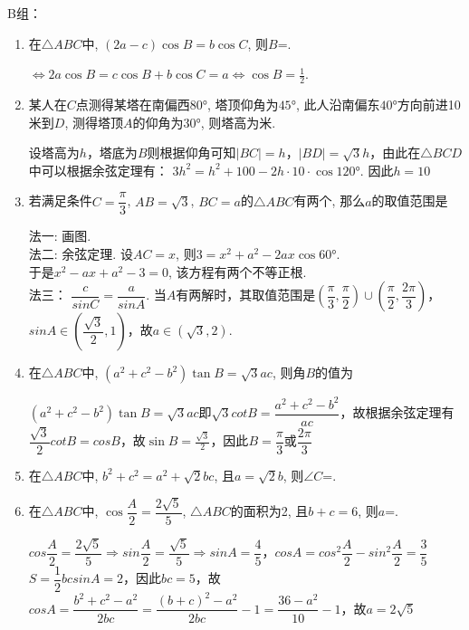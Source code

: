 B组：
\begin{enumerate}
\item 在$\triangle{ABC}$中, $(2a-c)\cos{B}=b\cos{C}$, 则$B$=. 
\begin{jieda}
$\iff 2a\cos{B}=c\cos{B}+b\cos{C}=a\iff\cos{B}=\frac{1}{2}$. 
\end{jieda}

\item 某人在$C$点测得某塔在南偏西$\ang{80}$, 塔顶仰角为$\ang{45}$, 此人沿南偏东$\ang{40}$方向前进10米到$D$, 测得塔顶$A$的仰角为$\ang{30}$, 则塔高为米.
\begin{jieda}
    设塔高为$h$，塔底为$B$则根据仰角可知$|BC| = h$，$|BD| = \sqrt{3}h$，由此在$\triangle BCD$中可以根据余弦定理有：
    $3h^2=h^2+100-2h\cdot10\cdot\cos\ang{120}$. 因此$h = 10$
    \end{jieda}

\item 若满足条件$C=\dfrac{\pi}{3}$, $AB=\sqrt{3}$, $BC=a$的$\triangle{ABC}$有两个, 那么$a$的取值范围是
\begin{jieda}
法一: 画图. \\
法二: 余弦定理. 设$AC=x$, 则$3=x^2+a^2-2ax\cos\ang{60}$. \\
于是$x^2-ax+a^2-3=0$, 该方程有两个不等正根. \\
法三： $\dfrac{c}{sinC} = \dfrac{a}{sinA}$. 当$A$有两解时，其取值范围是$(\dfrac{\pi}{3}, \dfrac{\pi}{2}) \cup (\dfrac{\pi}{2}, \dfrac{2\pi}{3})$，$sinA \in (\dfrac{\sqrt{3}}{2}, 1)$，故$a \in (\sqrt{3}, 2)$.
\end{jieda}

\item 在$\triangle{ABC}$中, $(a^2+c^2-b^2)\tan{B}=\sqrt{3}ac$, 则角$B$的值为

\begin{jieda}
$(a^2+c^2-b^2)\tan{B}=\sqrt{3}ac$即$\sqrt{3}cotB = \dfrac{a^2+c^2-b^2}{ac}$，故根据余弦定理有$\dfrac{\sqrt{3}}{2}cotB = cosB$，故$\sin{B}=\frac{\sqrt{3}}{2}$，因此$B = \dfrac{\pi}{3}$或$\dfrac{2\pi}{3}$
\end{jieda}

\item 在$\triangle{ABC}$中, $b^2+c^2=a^2+\sqrt{2}bc$, 且$a=\sqrt{2}b$, 则$\angle{C}$=. 

\item 在$\triangle{ABC}$中, $\cos\dfrac{A}{2}=\dfrac{2\sqrt{5}}{5}$, $\triangle{ABC}$的面积为2, 且$b+c=6$, 则$a$=. 
\begin{jieda}
    $cos\dfrac{A}{2} = \dfrac{2\sqrt{5}}{5} \Rightarrow sin\dfrac{A}{2} = \dfrac{\sqrt{5}}{5} \Rightarrow sinA = \dfrac{4}{5}$，$cosA = cos^2\dfrac{A}{2} - sin^2\dfrac{A}{2} = \dfrac{3}{5}$ \\
    $S = \dfrac{1}{2}bcsinA = 2$，因此$bc = 5$，故$cosA = \dfrac{b^2+c^2-a^2}{2bc} = \dfrac{(b+c)^2-a^2}{2bc} - 1 = \dfrac{36-a^2}{10} - 1$，故$a = 2\sqrt{5}$
\end{jieda}


\end{enumerate}
